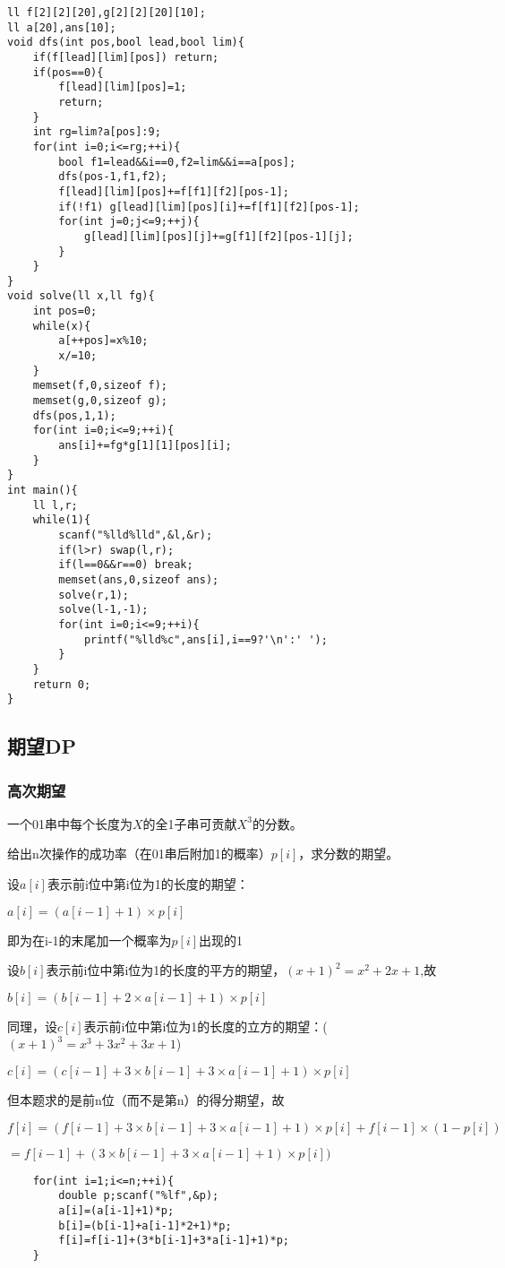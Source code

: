 \documentclass[UTF8]{ctexart}
\begin{document}
\begin{lstlisting}
ll f[2][2][20],g[2][2][20][10];
ll a[20],ans[10];
void dfs(int pos,bool lead,bool lim){
    if(f[lead][lim][pos]) return;
    if(pos==0){
        f[lead][lim][pos]=1;
        return;
    }
    int rg=lim?a[pos]:9;
    for(int i=0;i<=rg;++i){
        bool f1=lead&&i==0,f2=lim&&i==a[pos];
        dfs(pos-1,f1,f2);
        f[lead][lim][pos]+=f[f1][f2][pos-1];
        if(!f1) g[lead][lim][pos][i]+=f[f1][f2][pos-1];
        for(int j=0;j<=9;++j){
            g[lead][lim][pos][j]+=g[f1][f2][pos-1][j];
        }
    }
}
void solve(ll x,ll fg){
    int pos=0;
    while(x){
        a[++pos]=x%10;
        x/=10;
    }
    memset(f,0,sizeof f);
    memset(g,0,sizeof g);
    dfs(pos,1,1);
    for(int i=0;i<=9;++i){
        ans[i]+=fg*g[1][1][pos][i];
    }
}
int main(){
    ll l,r;
    while(1){
        scanf("%lld%lld",&l,&r);
        if(l>r) swap(l,r);
        if(l==0&&r==0) break;
        memset(ans,0,sizeof ans);
        solve(r,1);
        solve(l-1,-1);
        for(int i=0;i<=9;++i){
            printf("%lld%c",ans[i],i==9?'\n':' ');
        }
    }
    return 0;
} 
\end{lstlisting}
\subsection{期望DP}
\subsubsection{高次期望}
一个01串中每个长度为$X$的全1子串可贡献$X^3$的分数。

给出n次操作的成功率（在01串后附加1的概率）$p[i]$，求分数的期望。

设$a[i]$表示前i位中第i位为1的长度的期望：

$a[i]=(a[i−1]+1)×p[i]$

即为在i-1的末尾加一个概率为$p[i]$出现的1

设$b[i]$表示前i位中第i位为1的长度的平方的期望，$(x+1)^2=x^2+2x+1$,故

$b[i]=(b[i−1]+2×a[i−1]+1)×p[i]$

同理，设$c[i]$表示前i位中第i位为1的长度的立方的期望：($(x+1)^3=x^3+3x^2+3x+1$)

$c[i]=(c[i−1]+3×b[i−1]+3×a[i−1]+1)×p[i]$

但本题求的是前n位（而不是第n）的得分期望，故

$f[i]=(f[i−1]+3×b[i−1]+3×a[i−1]+1)×p[i]+f[i-1]×(1-p[i])$


$=f[i-1]+(3×b[i−1]+3×a[i−1]+1)×p[i])$
\begin{lstlisting}
    for(int i=1;i<=n;++i){
		double p;scanf("%lf",&p);
		a[i]=(a[i-1]+1)*p;
		b[i]=(b[i-1]+a[i-1]*2+1)*p;
		f[i]=f[i-1]+(3*b[i-1]+3*a[i-1]+1)*p;
	}  
\end{lstlisting}
\end{document}
